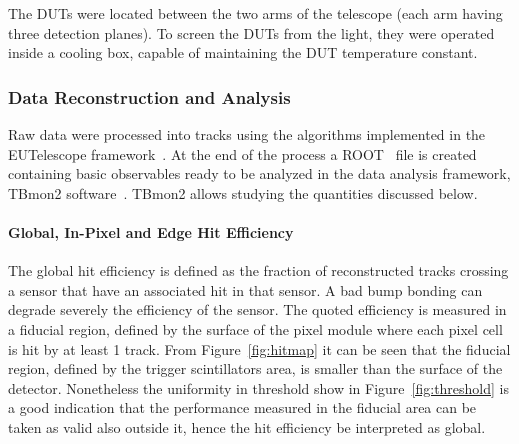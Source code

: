 The DUTs were located between the two arms of the telescope (each arm having three detection planes). To screen the DUTs from the light, they were operated inside a cooling box, capable  of maintaining the DUT temperature constant.

\subsubsection{Data Reconstruction and Analysis}

Raw data were processed into tracks using the algorithms implemented in the EUTelescope 
framework~\cite{eutelescope}.
At the end of the process a ROOT~\cite{root} file is created containing basic observables  ready to be analyzed in the data analysis framework, TBmon2 software~\cite{tbmon2}.
TBmon2 allows studying the quantities discussed below.

\paragraph{Global, In-Pixel and Edge Hit Efficiency}
The global hit efficiency is defined as the  fraction of reconstructed tracks crossing a sensor that have an associated hit in that sensor. A bad bump bonding can degrade severely the efficiency of the sensor.
The quoted efficiency is measured in a fiducial region, defined by the surface of the pixel module where each pixel cell is
hit by at least 1 track. From Figure~\ref{fig:hitmap} it can be seen that the fiducial region,  defined by the trigger scintillators area, is smaller than the surface of the detector. Nonetheless
the uniformity in threshold show in Figure~\ref{fig:threshold} is a good
indication that the performance measured in the fiducial area can be taken as valid also outside it,
hence the hit efficiency be interpreted as global.

